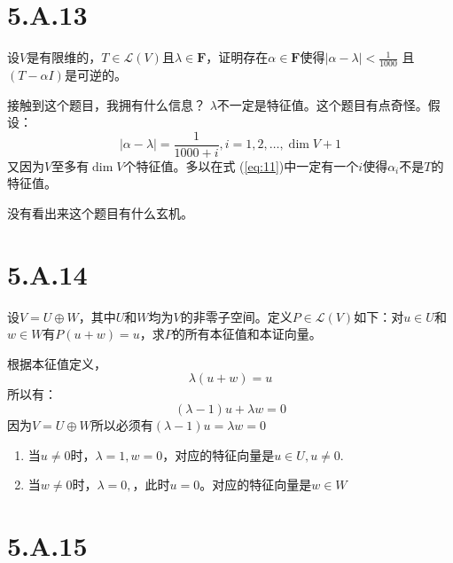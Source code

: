 \documentclass[10pt,a4paper,UTF8]{article}
\begin{document}
\section{5.A.13}
\label{sec:orgf0fe82a}


\begin{problem}
设\(V\)是有限维的，\(T\in \mathcal{L}(V)\)且\(\lambda\in \mathbf{F}\)，证明存在\(\alpha\in \mathbf{F}\)使得\(|\alpha - \lambda| < \frac{1}{1000}\) 且\((T-\alpha I)\)是可逆的。
\end{problem}

\begin{answer}
接触到这个题目，我拥有什么信息？ \(\lambda\)不一定是特征值。这个题目有点奇怪。假设：
\begin{equation}
\label{eq:11}
|\alpha - \lambda| = \frac{1}{1000 + i}, i = 1,2,\ldots ,\dim V + 1
\end{equation}
又因为\(V\)至多有\(\dim V\)个特征值。多以在式 (\ref{eq:11})中一定有一个\(i\)使得\(\alpha_{i}\)不是\(T\)的特征值。

没有看出来这个题目有什么玄机。
\end{answer}

\section{5.A.14}
\label{sec:orgad9eac1}


\begin{problem}
设\(V = U\oplus W\)，其中\(U\)和\(W\)均为\(V\)的非零子空间。定义\(P\in \mathcal{L}(V)\)如下：对\(u\in U\)和\(w\in W\)有\(P(u+w) = u\)，求\(P\)的所有本征值和本证向量。
\end{problem}

\begin{answer}
根据本征值定义，\[\lambda(u+w) = u\] 所以有：\[(\lambda -1) u + \lambda w = 0\] 因为\(V = U\oplus W\)所以必须有\((\lambda -1)u = \lambda w = 0\)

\begin{enumerate}
\item 当\(u\neq 0\)时，\(\lambda = 1, w = 0\)，对应的特征向量是\(u\in U, u\neq 0\).
\item 当\(w\neq 0\)时，\(\lambda = 0,\)，此时\(u = 0\)。对应的特征向量是\(w\in W\)
\end{enumerate}
\end{answer}
\section{5.A.15}
\label{sec:orge2670ef}
\end{document}
